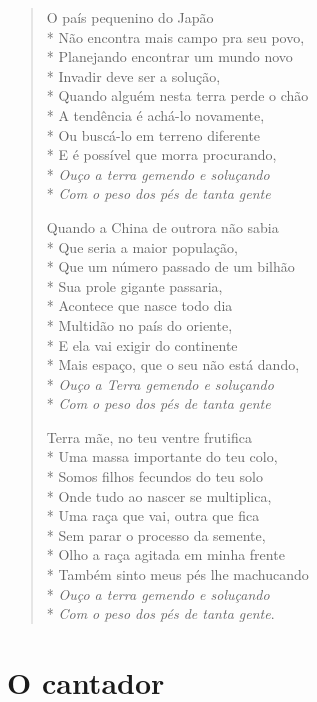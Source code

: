 \begin{verse}
O país pequenino do Japão\\*
Não encontra mais campo pra seu povo,\\*
Planejando encontrar um mundo novo\\*
Invadir deve ser a solução,\\*
Quando alguém nesta terra perde o chão\\*
A tendência é achá-lo novamente,\\*
Ou buscá-lo em terreno diferente\\*
E é possível que morra procurando,\\*
\textit{Ouço a terra gemendo e soluçando}\\*
\textit{Com o peso dos pés de tanta gente}

Quando a China de outrora não sabia\\*
Que seria a maior população,\\*
Que um número passado de um bilhão\\*
Sua prole gigante passaria,\\*
Acontece que nasce todo dia\\*
Multidão no país do oriente,\\*
E ela vai exigir do continente\\*
Mais espaço, que o seu não está dando,\\*
\textit{Ouço a Terra gemendo e soluçando}\\*
\textit{Com o peso dos pés de tanta gente}

Terra mãe, no teu ventre frutifica\\*
Uma massa importante do teu colo,\\*
Somos filhos fecundos do teu solo\\*
Onde tudo ao nascer se multiplica,\\*
Uma raça que vai, outra que fica\\*
Sem parar o processo da semente,\\*
Olho a raça agitada em minha frente\\*
Também sinto meus pés lhe machucando\\*
\textit{Ouço a terra gemendo e soluçando}\\*
\textit{Com o peso dos pés de tanta gente}.
\end{verse}


\chapter{O cantador}

